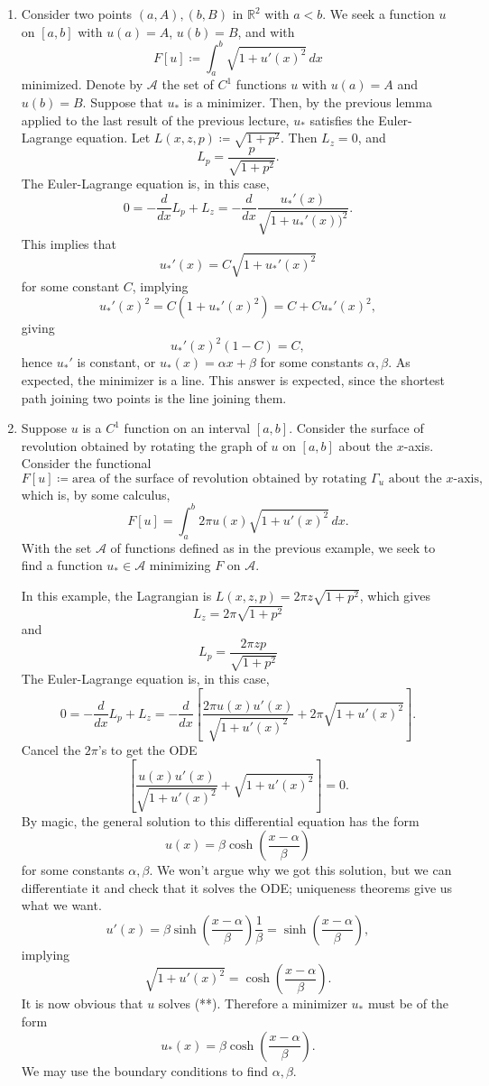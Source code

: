\documentclass[11pt]{book}
\newcommand{\R}{\mathbb{R}}
\begin{document}
\begin{enumerate}
\item
Consider two points $(a,A), (b,B)$ in $\R^2$ with $a < b$. We seek a function $u$ on $[a,b]$ with $u(a) = A$, $u(b) = B$, and with
\[
F[u] \coloneqq \int_a^b \sqrt{1 + u'(x)^2} \, dx
\]
minimized. Denote by $\mathcal{A}$ the set of $C^1$ functions $u$ with $u(a) = A$ and $u(b) = B$. Suppose that $u_*$ is a minimizer. Then, by the previous lemma applied to the last result of the previous lecture, $u_*$ satisfies the Euler-Lagrange equation. Let $L(x,z,p) \coloneqq \sqrt{1 + p^2}$. Then $L_z = 0$, and
\[
L_p = \frac{p}{\sqrt{1 + p^2}}.
\]
The Euler-Lagrange equation is, in this case,
\[
\tag{*}
0 = -\frac{d}{dx} L_p + L_z = -\frac{d}{dx} \frac{u_*'(x)}{\sqrt{1 + u_*'(x))^2}}.
\]
This implies that 
\[
u_*'(x) = C\sqrt{1 + u_*'(x)^2}
\]
for some constant $C$, implying
\[
u_*'(x)^2 = C(1 + u_*'(x)^2) = C + C u_*'(x)^2,
\]
giving
\[
u_*'(x)^2(1 - C) = C,
\]
hence $u_*'$ is constant, or $u_*(x) = \alpha x + \beta$ for some constants $\alpha, \beta$. As expected, the minimizer is a line. This answer is expected, since the shortest path joining two points is the line joining them.

\item
Suppose $u$ is a $C^1$ function on an interval $[a,b]$. Consider the surface of revolution obtained by rotating the graph of $u$ on $[a,b]$ about the $x$-axis. Consider the functional
\[
F[u] \coloneqq \text{area of the surface of revolution obtained by rotating $\Gamma_u$ about the $x$-axis},
\]
which is, by some calculus,
\[
F[u] = \int_a^b 2\pi u(x) \sqrt{1 + u'(x)^2} \, dx.
\]
With the set $\mathcal{A}$ of functions defined as in the previous example, we seek to find a function $u_* \in \mathcal{A}$ minimizing $F$ on $\mathcal{A}$.

In this example, the Lagrangian is $L(x,z,p) = 2\pi z \sqrt{1 + p^2}$, which gives
\[
L_z = 2\pi \sqrt{1 + p^2}
\]
and
\[
L_p = \frac{2\pi z p}{\sqrt{1 + p^2}}
\]
The Euler-Lagrange equation is, in this case,
\[
0 = -\frac{d}{dx} L_p + L_z = -\frac{d}{dx} \left[ \frac{2\pi u(x)u'(x)}{\sqrt{1 + u'(x)^2}} + 2\pi \sqrt{1 + u'(x)^2} \right].
\]
Cancel the $2\pi$'s to get the ODE
\[
\tag{**}
\left[ \frac{u(x)u'(x)}{\sqrt{1 + u'(x)^2}} + \sqrt{1 + u'(x)^2} \right] = 0.
\]
By magic, the general solution to this differential equation has the form
\[
u(x) = \beta \cosh\left(\frac{x - \alpha}{\beta} \right)
\]
for some constants $\alpha, \beta$. We won't argue why we got this solution, but we can differentiate it and check that it solves the ODE; uniqueness theorems give us what we want.
\[
u'(x) = \beta \sinh \left( \frac{x - \alpha}{\beta} \right) \frac{1}{\beta} = \sinh \left( \frac{x - \alpha}{\beta} \right),
\]
implying
\[
\sqrt{1 + u'(x)^2} = \cosh \left( \frac{x - \alpha}{\beta} \right).
\]
It is now obvious that $u$ solves (**). Therefore a minimizer $u_*$ must be of the form
\[
u_*(x) = \beta \cosh \left( \frac{x - \alpha}{\beta} \right).
\]
We may use the boundary conditions to find $\alpha, \beta$.


\end{enumerate}
\end{document}
